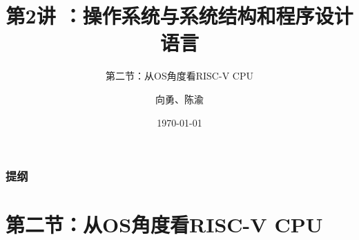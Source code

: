 


\title[第2讲]{第2讲 ：操作系统与系统结构和程序设计语言} %
\subtitle{第二节：从OS角度看RISC-V CPU}
\author{向勇、陈渝} %
\date{\today} %



\begin{frame}
\titlepage %
\end{frame}

\begin{frame}
\frametitle{提纲} %
\tableofcontents %
\end{frame}


\section{第二节：从OS角度看RISC-V CPU } %

